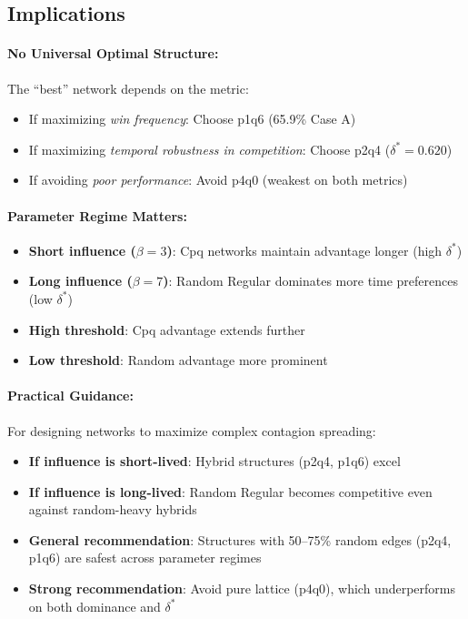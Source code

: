 \documentclass[12pt,a4paper]{article}
\begin{document}
\subsection{Implications}

\paragraph{No Universal Optimal Structure:}
The ``best'' network depends on the metric:
\begin{itemize}
    \item If maximizing \textit{win frequency}: Choose p1q6 (65.9\% Case A)
    \item If maximizing \textit{temporal robustness in competition}: Choose p2q4 ($\delta^* = 0.620$)
    \item If avoiding \textit{poor performance}: Avoid p4q0 (weakest on both metrics)
\end{itemize}

\paragraph{Parameter Regime Matters:}
\begin{itemize}
    \item \textbf{Short influence ($\beta=3$)}: Cpq networks maintain advantage longer (high $\delta^*$)
    \item \textbf{Long influence ($\beta=7$)}: Random Regular dominates more time preferences (low $\delta^*$)
    \item \textbf{High threshold}: Cpq advantage extends further
    \item \textbf{Low threshold}: Random advantage more prominent
\end{itemize}

\paragraph{Practical Guidance:}
For designing networks to maximize complex contagion spreading:
\begin{itemize}
    \item \textbf{If influence is short-lived}: Hybrid structures (p2q4, p1q6) excel
    \item \textbf{If influence is long-lived}: Random Regular becomes competitive even against random-heavy hybrids
    \item \textbf{General recommendation}: Structures with 50--75\% random edges (p2q4, p1q6) are safest across parameter regimes
    \item \textbf{Strong recommendation}: Avoid pure lattice (p4q0), which underperforms on both dominance and $\delta^*$
\end{itemize}
\end{document}
